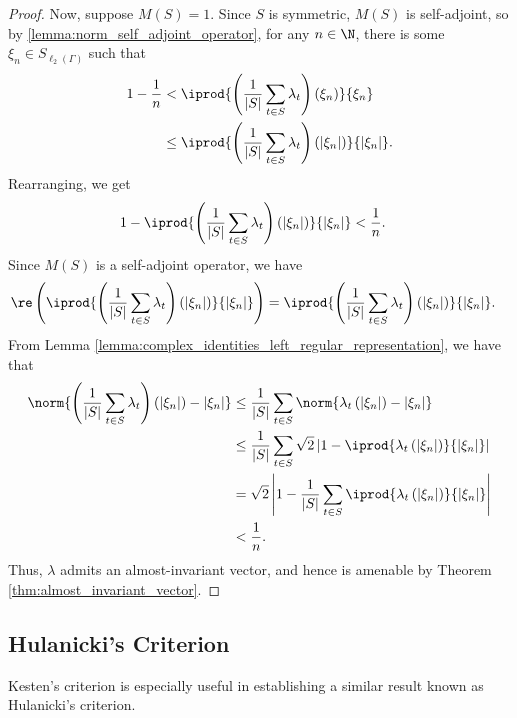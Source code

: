 \begin{proof}
  Now, suppose $M(S) = 1$. Since $S$ is symmetric, $M(S)$ is self-adjoint, so by \ref{lemma:norm_self_adjoint_operator}, for any $n\in \N$, there is some $\xi_n\in S_{\ell_2\left( \Gamma \right)}$ such that
  \begin{align*}
    1-\frac{1}{n} &< \iprod{\left( \frac{1}{\left\vert S \right\vert}\sum_{t\in S}\lambda_t \right)\left( \xi_n \right)}{\xi_n}\\
                  &\leq \iprod{\left( \frac{1}{\left\vert S \right\vert}\sum_{t\in S}\lambda_t \right)\left( \left\vert \xi_n \right\vert \right)}{\left\vert \xi_n \right\vert}.
  \end{align*}
  Rearranging, we get
  \begin{align*}
    1- \iprod{\left( \frac{1}{\left\vert S \right\vert}\sum_{t\in S}\lambda_t \right)\left( \left\vert \xi_n \right\vert \right)}{\left\vert \xi_n \right\vert} &< \frac{1}{n}.
  \end{align*}
  Since $M(S)$ is a self-adjoint operator, we have
  \begin{align*}
    \re\left( \iprod{\left( \frac{1}{\left\vert S \right\vert}\sum_{t\in S}\lambda_t \right)\left( \left\vert \xi_n \right\vert \right)}{\left\vert \xi_n \right\vert} \right) &= \iprod{\left( \frac{1}{\left\vert S \right\vert}\sum_{t\in S}\lambda_t \right)\left( \left\vert \xi_n \right\vert \right)}{\left\vert \xi_n \right\vert}.
  \end{align*}
  From Lemma \ref{lemma:complex_identities_left_regular_representation}, we have that
  \begin{align*}
    \norm{\left( \frac{1}{\left\vert S \right\vert}\sum_{t\in S}\lambda_t \right)\left( \left\vert \xi_n \right\vert \right) - \left\vert \xi_n \right\vert} &\leq \frac{1}{\left\vert S \right\vert}\sum_{t\in S}\norm{\lambda_t\left( \left\vert \xi_n \right\vert \right) - \left\vert \xi_n \right\vert}\\
                                                                                                                                                                    &\leq \frac{1}{\left\vert S \right\vert}\sum_{t\in S}\sqrt{2} \left\vert 1 - \iprod{\lambda_t\left( \left\vert \xi_n \right\vert \right)}{\left\vert \xi_n \right\vert} \right\vert\\
                                                                                                                                                                    &= \sqrt{2}\left\vert 1 - \frac{1}{\left\vert S \right\vert} \sum_{t\in S} \iprod{\lambda_t\left( \left\vert \xi_n \right\vert \right)}{\left\vert \xi_n \right\vert} \right\vert\\
                                                                                                                                                                    &< \frac{1}{n}.
  \end{align*}
  Thus, $\lambda$ admits an almost-invariant vector, and hence is amenable by Theorem \ref{thm:almost_invariant_vector}.
\end{proof}
\subsection{Hulanicki's Criterion}%
Kesten's criterion is especially useful in establishing a similar result known as Hulanicki's criterion.
